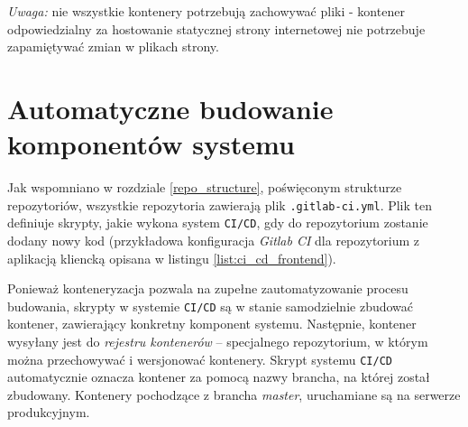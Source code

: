 \textit{Uwaga:} nie wszystkie kontenery potrzebują zachowywać pliki - kontener
odpowiedzialny za hostowanie statycznej strony internetowej nie potrzebuje
zapamiętywać zmian w plikach strony. 

\section{Automatyczne budowanie komponentów systemu}

Jak wspomniano w rozdziale \ref{repo_structure}, poświęconym strukturze repozytoriów,
wszystkie repozytoria zawierają plik \texttt{.gitlab-ci.yml}. Plik ten definiuje skrypty,
jakie wykona system \texttt{CI/CD}, gdy do repozytorium zostanie dodany nowy kod
(przykładowa konfiguracja \textit{Gitlab CI} dla repozytorium z aplikacją kliencką
opisana w listingu \ref{list:ci_cd_frontend}).

Ponieważ konteneryzacja pozwala na zupełne zautomatyzowanie procesu budowania,
skrypty w systemie \texttt{CI/CD} są w stanie samodzielnie zbudować kontener,
zawierający konkretny komponent systemu. Następnie, kontener wysyłany jest
do \textit{rejestru kontenerów} -- specjalnego repozytorium, w którym można
przechowywać i wersjonować kontenery. Skrypt systemu \texttt{CI/CD} automatycznie oznacza
kontener za pomocą nazwy brancha, na której został zbudowany. Kontenery pochodzące
z brancha \textit{master}, uruchamiane są na serwerze produkcyjnym.

